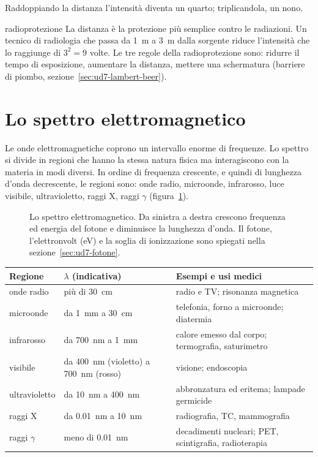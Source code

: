 Raddoppiando la distanza l'intensità diventa un quarto; triplicandola, un nono.

\begin{applicazione}{radioprotezione}
La distanza è la protezione più semplice contro le radiazioni. Un tecnico di radiologia che passa da \SI{1}{\metre} a \SI{3}{\metre} dalla sorgente riduce l'intensità che lo raggiunge di $3^2 = 9$ volte. Le tre regole della radioprotezione sono: ridurre il tempo di esposizione, aumentare la distanza, mettere una schermatura (barriere di piombo, sezione~\ref{sec:ud7-lambert-beer}).
\end{applicazione}

\section{Lo spettro elettromagnetico}
\label{sec:ud7-spettro}

Le onde elettromagnetiche coprono un intervallo enorme di frequenze. Lo spettro si divide in regioni che hanno la stessa natura fisica ma interagiscono con la materia in modi diversi. In ordine di frequenza crescente, e quindi di lunghezza d'onda decrescente, le regioni sono: onde radio, microonde, infrarosso, luce visibile, ultravioletto, raggi X, raggi $\gamma$ (figura~\ref{fig:ud7-spettro}).

\begin{figure}[h]
\centering

\caption{Lo spettro elettromagnetico. Da sinistra a destra crescono frequenza ed energia del fotone e diminuisce la lunghezza d'onda. Il fotone, l'elettronvolt (eV) e la soglia di ionizzazione sono spiegati nella sezione~\ref{sec:ud7-fotone}.}
\label{fig:ud7-spettro}
\end{figure}

\begin{center}
\small
\begin{tabularx}{\linewidth}{@{}l l X@{}}
\toprule
Regione & $\lambda$ (indicativa) & Esempi e usi medici \\
\midrule
onde radio & più di \SI{30}{\centi\metre} & radio e TV; risonanza magnetica \\
microonde & da \SI{1}{\milli\metre} a \SI{30}{\centi\metre} & telefonia, forno a microonde; diatermia \\
infrarosso & da \SI{700}{\nano\metre} a \SI{1}{\milli\metre} & calore emesso dal corpo; termografia, saturimetro \\
visibile & da \SI{400}{\nano\metre} (violetto) a \SI{700}{\nano\metre} (rosso) & visione; endoscopia \\
ultravioletto & da \SI{10}{\nano\metre} a \SI{400}{\nano\metre} & abbronzatura ed eritema; lampade germicide \\
raggi X & da \SI{0,01}{\nano\metre} a \SI{10}{\nano\metre} & radiografia, TC, mammografia \\
raggi $\gamma$ & meno di \SI{0,01}{\nano\metre} & decadimenti nucleari; PET, scintigrafia, radioterapia \\
\bottomrule
\end{tabularx}
\end{center}

